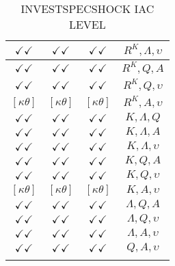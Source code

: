 \documentclass[a4paper,10pt]{article}
\begin{document}
\begin{longtable}{|c|c|c|c|}
$\checkmark\checkmark$ & $\checkmark\checkmark$ & $\checkmark\checkmark$ & ${R^{K}},{\Lambda},{\upsilon}$ \\
\hline
$\checkmark\checkmark$ & $\checkmark\checkmark$ & $\checkmark\checkmark$ & ${R^{K}},{Q},{A}$ \\
\hline
$\checkmark\checkmark$ & $\checkmark\checkmark$ & $\checkmark\checkmark$ & ${R^{K}},{Q},{\upsilon}$ \\
\hline
$[\kappa \theta ]$ & $[\kappa \theta ]$ & $[\kappa \theta ]$ & ${R^{K}},{A},{\upsilon}$ \\
\hline
$\checkmark\checkmark$ & $\checkmark\checkmark$ & $\checkmark\checkmark$ & ${K},{\Lambda},{Q}$ \\
\hline
$\checkmark\checkmark$ & $\checkmark\checkmark$ & $\checkmark\checkmark$ & ${K},{\Lambda},{A}$ \\
\hline
$\checkmark\checkmark$ & $\checkmark\checkmark$ & $\checkmark\checkmark$ & ${K},{\Lambda},{\upsilon}$ \\
\hline
$\checkmark\checkmark$ & $\checkmark\checkmark$ & $\checkmark\checkmark$ & ${K},{Q},{A}$ \\
\hline
$\checkmark\checkmark$ & $\checkmark\checkmark$ & $\checkmark\checkmark$ & ${K},{Q},{\upsilon}$ \\
\hline
$[\kappa \theta ]$ & $[\kappa \theta ]$ & $[\kappa \theta ]$ & ${K},{A},{\upsilon}$ \\
\hline
$\checkmark\checkmark$ & $\checkmark\checkmark$ & $\checkmark\checkmark$ & ${\Lambda},{Q},{A}$ \\
\hline
$\checkmark\checkmark$ & $\checkmark\checkmark$ & $\checkmark\checkmark$ & ${\Lambda},{Q},{\upsilon}$ \\
\hline
$\checkmark\checkmark$ & $\checkmark\checkmark$ & $\checkmark\checkmark$ & ${\Lambda},{A},{\upsilon}$ \\
\hline
$\checkmark\checkmark$ & $\checkmark\checkmark$ & $\checkmark\checkmark$ & ${Q},{A},{\upsilon}$ \\
\hline
\caption{INVESTSPECSHOCK IAC LEVEL}
\label{table:MyTableLabel}
\end{longtable}
\end{document}
